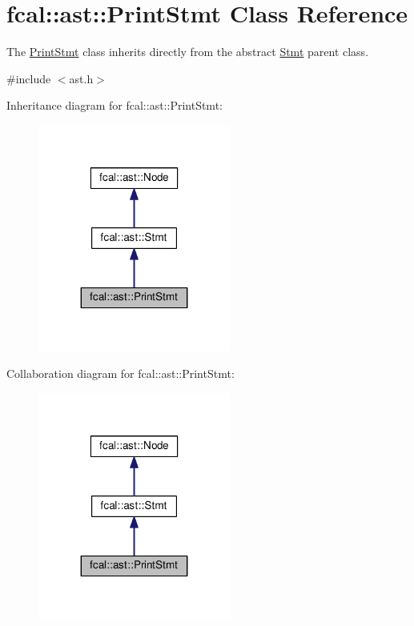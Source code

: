 \hypertarget{classfcal_1_1ast_1_1PrintStmt}{}\section{fcal\+:\+:ast\+:\+:Print\+Stmt Class Reference}
\label{classfcal_1_1ast_1_1PrintStmt}


The \hyperlink{classfcal_1_1ast_1_1PrintStmt}{Print\+Stmt} class inherits directly from the abstract \hyperlink{classfcal_1_1ast_1_1Stmt}{Stmt} parent class.  




{\ttfamily \#include $<$ast.\+h$>$}



Inheritance diagram for fcal\+:\+:ast\+:\+:Print\+Stmt\+:\nopagebreak
\begin{figure}[H]
\begin{center}
\leavevmode
\includegraphics[width=179pt]{classfcal_1_1ast_1_1PrintStmt__inherit__graph}
\end{center}
\end{figure}


Collaboration diagram for fcal\+:\+:ast\+:\+:Print\+Stmt\+:\nopagebreak
\begin{figure}[H]
\begin{center}
\leavevmode
\includegraphics[width=179pt]{classfcal_1_1ast_1_1PrintStmt__coll__graph}
\end{center}
\end{figure}
